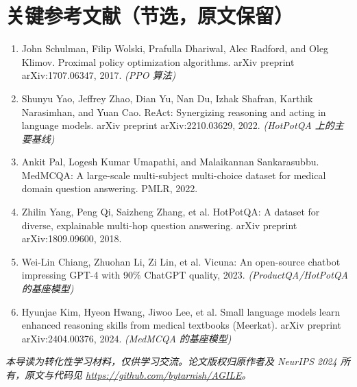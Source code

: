 \documentclass[11pt,UTF8,fontset=fandol]{ctexart}
\begin{document}
\section*{关键参考文献（节选，原文保留）}
\small
\begin{enumerate}[leftmargin=2em]
\item John Schulman, Filip Wolski, Prafulla Dhariwal, Alec Radford, and Oleg Klimov. Proximal policy optimization algorithms. arXiv preprint arXiv:1707.06347, 2017. \textit{(PPO 算法)}
\item Shunyu Yao, Jeffrey Zhao, Dian Yu, Nan Du, Izhak Shafran, Karthik Narasimhan, and Yuan Cao. ReAct: Synergizing reasoning and acting in language models. arXiv preprint arXiv:2210.03629, 2022. \textit{(HotPotQA 上的主要基线)}
\item Ankit Pal, Logesh Kumar Umapathi, and Malaikannan Sankarasubbu. MedMCQA: A large-scale multi-subject multi-choice dataset for medical domain question answering. PMLR, 2022.
\item Zhilin Yang, Peng Qi, Saizheng Zhang, et al. HotPotQA: A dataset for diverse, explainable multi-hop question answering. arXiv preprint arXiv:1809.09600, 2018.
\item Wei-Lin Chiang, Zhuohan Li, Zi Lin, et al. Vicuna: An open-source chatbot impressing GPT-4 with 90\% ChatGPT quality, 2023. \textit{(ProductQA/HotPotQA 的基座模型)}
\item Hyunjae Kim, Hyeon Hwang, Jiwoo Lee, et al. Small language models learn enhanced reasoning skills from medical textbooks (Meerkat). arXiv preprint arXiv:2404.00376, 2024. \textit{(MedMCQA 的基座模型)}
\end{enumerate}

\vspace{1em}
\begin{center}\small\itshape
本导读为转化性学习材料，仅供学习交流。论文版权归原作者及 NeurIPS 2024 所有，原文与代码见 \url{https://github.com/bytarnish/AGILE}。
\end{center}
\end{document}

